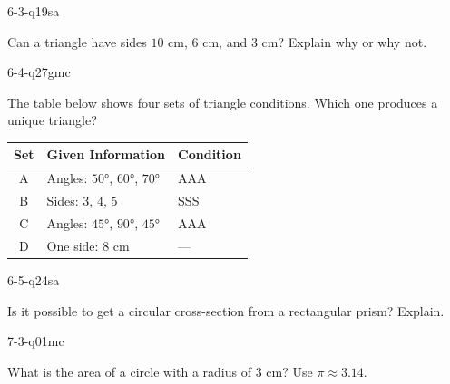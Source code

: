 \begin{practiceQuestion}{6-3-q19}{sa}
\begin{questionText}
Can a triangle have sides $10$ cm, $6$ cm, and $3$ cm? Explain why or why not.
\end{questionText}
\end{practiceQuestion}

\begin{practiceQuestion}{6-4-q27}{gmc}
\begin{questionText}
The table below shows four sets of triangle conditions. Which one produces a unique triangle?

\begin{center}
\begin{tabular}{|c|l|l|}
\hline
\textbf{Set} & \textbf{Given Information} & \textbf{Condition} \\
\hline
A & Angles: $50°$, $60°$, $70°$ & AAA \\
\hline
B & Sides: $3$, $4$, $5$ & SSS \\
\hline
C & Angles: $45°$, $90°$, $45°$ & AAA \\
\hline
D & One side: $8$ cm & --- \\
\hline
\end{tabular}
\end{center}
\end{questionText}
\end{practiceQuestion}

\begin{practiceQuestion}{6-5-q24}{sa}
\begin{questionText}
Is it possible to get a circular cross-section from a rectangular prism? Explain.
\end{questionText}
\end{practiceQuestion}

\begin{practiceQuestion}{7-3-q01}{mc}
\begin{questionText}
What is the area of a circle with a radius of $3$ cm? Use $\pi \approx 3.14$.
\end{questionText}
\end{practiceQuestion}

